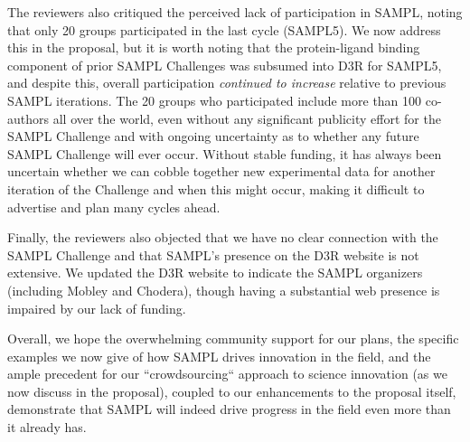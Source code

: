 \documentclass[11pt]{article}
\begin{document}
The reviewers also critiqued the perceived lack of participation in SAMPL, noting that only 20 groups participated in the last cycle (SAMPL5). 
We now address this in the proposal, but it is worth noting that the protein-ligand binding component of prior SAMPL Challenges was subsumed into D3R for SAMPL5, and despite this, overall participation \emph{continued to increase} relative to previous SAMPL iterations. 
The 20 groups who participated include more than 100 co-authors all over the world, even without any significant publicity effort for the SAMPL Challenge and with ongoing uncertainty as to whether any future SAMPL Challenge will ever occur. 
Without stable funding, it has always been uncertain whether we can cobble together new experimental data for another iteration of the Challenge and when this might occur, making it difficult to advertise and plan many cycles ahead. 

Finally, the reviewers also objected that we have no clear connection with the SAMPL Challenge and that SAMPL's presence on the D3R website is not extensive. 
We updated the D3R website to indicate the SAMPL organizers (including Mobley and Chodera), though having a substantial web presence is impaired by our lack of funding. 

Overall, we hope the overwhelming community support for our plans, the specific examples we now give of how SAMPL drives innovation in the field, and the ample precedent for our ``crowdsourcing`` approach to science innovation (as we now discuss in the proposal), coupled to our enhancements to the proposal itself, demonstrate that SAMPL will indeed drive progress in the field even more than it already has. 


\end{document}
